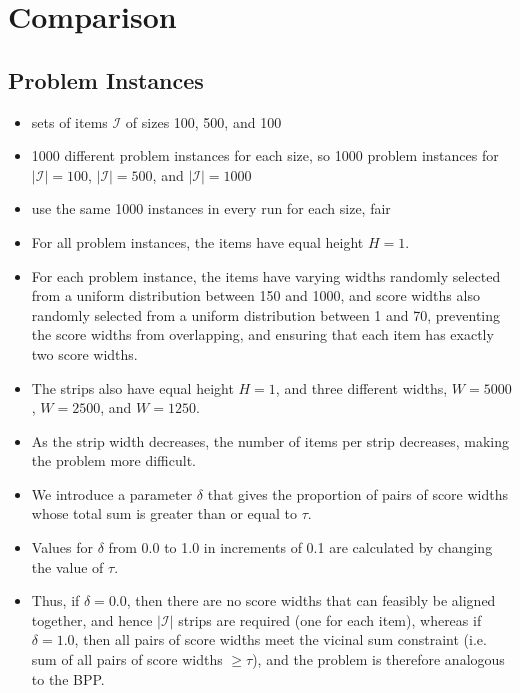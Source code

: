 \documentclass[oribibl]{llncs}
\begin{document}
\section{Comparison}
\subsection{Problem Instances}
\begin{itemize}
	\item sets of items $\mathcal{I}$ of sizes 100, 500, and 100
	\item 1000 different problem instances for each size, so 1000 problem instances for $|\mathcal{I}| = 100$, $|\mathcal{I}| = 500$, and $|\mathcal{I}| = 1000$
	\item use the same 1000 instances in every run for each size, fair
	\item For all problem instances, the items have equal height $H = 1$.
	\item For each problem instance, the items have varying widths randomly selected from a uniform distribution between 150 and 1000, and score widths also randomly selected from a uniform distribution between 1 and 70, preventing the score widths from overlapping, and ensuring that each item has exactly two score widths.
	\item The strips also have equal height $H = 1$, and three different widths, $W = 5000$, $W = 2500$, and $W = 1250$. 
	\item As the strip width decreases, the number of items per strip decreases, making the problem more difficult.
	\item We introduce a parameter $\delta$ that gives the proportion of pairs of score widths whose total sum is greater than or equal to $\tau$. 
	\item Values for $\delta$ from 0.0 to 1.0 in increments of 0.1 are calculated by changing the value of $\tau$. 
	\item Thus, if $\delta  = 0.0$, then there are no score widths that can feasibly be aligned together, and hence $|\mathcal{I}|$ strips are required (one for each item), whereas if $\delta = 1.0$, then all pairs of score widths meet the vicinal sum constraint (i.e. sum of all pairs of score widths $\geq \tau$), and the problem is therefore analogous to the BPP. 
\end{itemize}
\end{document}
